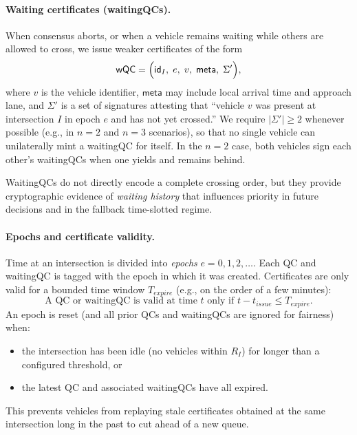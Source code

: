 \documentclass[fleqn,10pt]{olplainarticle}
\begin{document}
\paragraph{Waiting certificates (waitingQCs).}
When consensus aborts, or when a vehicle remains waiting while others are allowed to cross, we issue weaker certificates of the form
\[
  \mathsf{wQC} = \Bigl(\mathsf{id}_I,\; e,\; v,\; \mathsf{meta},\; \Sigma'\Bigr),
\]
where $v$ is the vehicle identifier, $\mathsf{meta}$ may include local arrival time and approach lane, and $\Sigma'$ is a set of signatures attesting that ``vehicle $v$ was present at intersection $I$ in epoch $e$ and has not yet crossed.'' We require $|\Sigma'| \ge 2$ whenever possible (e.g., in $n=2$ and $n=3$ scenarios), so that no single vehicle can unilaterally mint a waitingQC for itself. In the $n=2$ case, both vehicles sign each other's waitingQCs when one yields and remains behind.

WaitingQCs do not directly encode a complete crossing order, but they provide cryptographic evidence of \emph{waiting history} that influences priority in future decisions and in the fallback time-slotted regime.

\paragraph{Epochs and certificate validity.}
Time at an intersection is divided into \emph{epochs} $e = 0,1,2,\dots$. Each QC and waitingQC is tagged with the epoch in which it was created. Certificates are only valid for a bounded time window $T_{\mathit{expire}}$ (e.g., on the order of a few minutes):
\[
  \text{A QC or waitingQC is valid at time } t \text{ only if } t - t_{\mathit{issue}} \le T_{\mathit{expire}}.
\]
An epoch is reset (and all prior QCs and waitingQCs are ignored for fairness) when:
\begin{itemize}
  \item the intersection has been idle (no vehicles within $R_I$) for longer than a configured threshold, or
  \item the latest QC and associated waitingQCs have all expired.
\end{itemize}
This prevents vehicles from replaying stale certificates obtained at the same intersection long in the past to cut ahead of a new queue.
\end{document}
